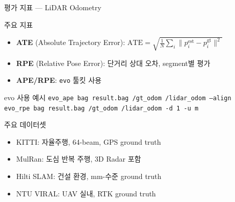 \begin{frame}{평가 지표 — LiDAR Odometry}
  \begin{block}{주요 지표}
    \begin{itemize}
      \item \textbf{ATE} (Absolute Trajectory Error):
        $\text{ATE} = \sqrt{\frac{1}{N}\sum_i \|p_i^{\text{est}} - p_i^{\text{gt}}\|^2}$
      \item \textbf{RPE} (Relative Pose Error):
        단거리 상대 오차, segment별 평가
      \item \textbf{APE/RPE}: \texttt{evo} 툴킷 사용
    \end{itemize}
  \end{block}
  \pause
\begin{exampleblock}{evo 사용 예시}
  \texttt{evo\_ape bag result.bag /gt\_odom /lidar\_odom --align}\\
  \texttt{evo\_rpe bag result.bag /gt\_odom /lidar\_odom -d 1 -u m}
\end{exampleblock}
  \pause
  \begin{block}{주요 데이터셋}
    \begin{itemize}
      \item KITTI: 자율주행, 64-beam, GPS ground truth
      \item MulRan: 도심 반복 주행, 3D Radar 포함
      \item Hilti SLAM: 건설 환경, mm-수준 ground truth
      \item NTU VIRAL: UAV 실내, RTK ground truth
    \end{itemize}
  \end{block}
\end{frame}

